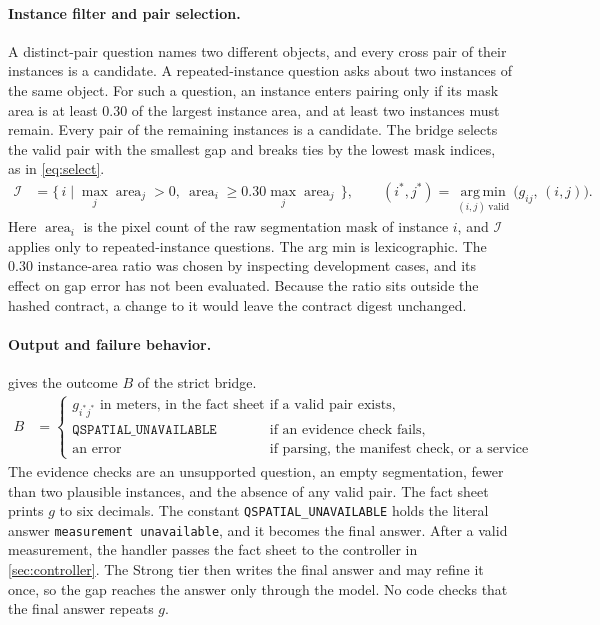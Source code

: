 \documentclass{article}
\begin{document}
\paragraph{Instance filter and pair selection.}
A distinct-pair question names two different objects, and every cross pair of their instances is a candidate. A repeated-instance question asks about two instances of the same object. For such a question, an instance enters pairing only if its mask area is at least 0.30 of the largest instance area, and at least two instances must remain. Every pair of the remaining instances is a candidate. The bridge selects the valid pair with the smallest gap and breaks ties by the lowest mask indices, as in \cref{eq:select}.
\begin{align}
  \mathcal{I} &= \{\, i \mid \max_j \operatorname{area}_j > 0,\ \operatorname{area}_i \ge 0.30 \max_j \operatorname{area}_j \,\}, \qquad
  (i^*, j^*) = \operatorname*{arg\,min}_{(i, j)\ \text{valid}} \bigl(g_{ij},\, (i, j)\bigr). \label{eq:select}
\end{align}
Here $\operatorname{area}_i$ is the pixel count of the raw segmentation mask of instance $i$, and $\mathcal{I}$ applies only to repeated-instance questions. The arg min is lexicographic. The 0.30 instance-area ratio was chosen by inspecting development cases, and its effect on gap error has not been evaluated. Because the ratio sits outside the hashed contract, a change to it would leave the contract digest unchanged.

\paragraph{Output and failure behavior.}
 gives the outcome $B$ of the strict bridge.
\begin{align}
  B &=
  \begin{cases}
    g_{i^* j^*} \text{ in meters, in the fact sheet} & \text{if a valid pair exists},\\
    \texttt{QSPATIAL\_UNAVAILABLE} & \text{if an evidence check fails},\\
    \text{an error} & \text{if parsing, the manifest check, or a service fails.}
  \end{cases} \label{eq:strictout}
\end{align}
The evidence checks are an unsupported question, an empty segmentation, fewer than two plausible instances, and the absence of any valid pair. The fact sheet prints $g$ to six decimals. The constant \texttt{QSPATIAL\_UNAVAILABLE} holds the literal answer \texttt{measurement unavailable}, and it becomes the final answer. After a valid measurement, the handler passes the fact sheet to the controller in \cref{sec:controller}. The Strong tier then writes the final answer and may refine it once, so the gap reaches the answer only through the model. No code checks that the final answer repeats $g$.
\end{document}

